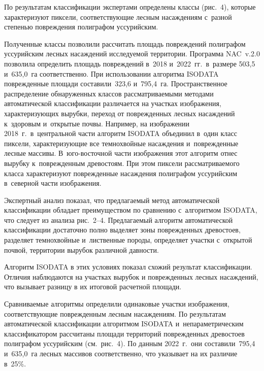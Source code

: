 \begin{multicols}{2}
  По результатам классификации экспертами определены классы 
(рис.~4), которые характеризуют пиксели, 
соответствующие лесным на\-саж\-де\-ни\-ям с~раз\-ной сте\-пенью по\-вреж\-де\-ния 
полиграфом уссурийским. 

Полученные классы позволили рассчитать площадь 
по\-вреж\-де\-ний полиграфом уссурийским лесных на\-саж\-де\-ний ис\-сле\-ду\-емой 
территории. Программа NAC~v.2.0 позволила определить площадь 
по\-вреж\-де\-ний в~2018 и~2022~гг.\ в~размере 503,5 и~635,0~га соответственно. При 
использовании алгоритма ISODATA по\-вреж\-де\-нные площади со\-ста\-ви\-ли~323,6 
и~795,4~га. Пространственное распределение обнаруженных классов 
рас\-смат\-ри\-ва\-емы\-ми методами автоматической классификации различается на 
участ\-ках изображения, ха\-рак\-те\-ри\-зу\-ющих вырубки, переход от поврежденных 
лес\-ных на\-саж\-де\-ний к~здоровым и~открытые поч\-вы. Например, на изображении 
2018~г.\ в~центральной час\-ти алгоритм ISODATA объединил в~один класс 
пиксели, ха\-рак\-те\-ри\-зу\-ющие все темнохвойные на\-саж\-де\-ния и~по\-вреж\-ден\-ные 
лесные массивы. В~юго-вос\-точ\-ной части изображения этот алгоритм отнес 
вы\-руб\-ку к~по\-вреж\-ден\-ным древостоям. При этом пиксели рас\-смат\-ри\-ва\-емо\-го 
клас\-са характеризуют по\-вреж\-ден\-ные насаждения полиграфом уссурийским 
в~северной час\-ти изоб\-ра\-же\-ния.
  

  
  Экспертный анализ показал, что пред\-ла\-га\-емый метод автоматической 
классификации обладает преимуществом по сравнению с~алгоритмом 
\mbox{ISODATA}, что следует из анализа рис.~2--4. Пред\-ла\-га\-емый алгоритм 
автоматической классификации достаточно пол\-но выделяет зоны 
по\-вреж\-ден\-ных древостоев, разделяет темнохвойные и~лиственные породы, 
определяет участ\-ки с~открытой почвой, территории вырубок различной 
дав\-ности.


 Алгоритм ISODATA в этих условиях показал схожий результат 
классификации. Отличия наблюдаются на участках вырубок и поврежденных 
лесных насаждений, что вызывает разницу в их итоговой расчетной площади. 

Сравниваемые алгоритмы определили одинаковые участки изображения, 
со\-от\-вет\-ст\-ву\-ющие по\-вреж\-ден\-ным лесным на\-саж\-де\-ни\-ям. По результатам 
автоматической классификации алгоритмом \mbox{ISODATA} и~не\-па\-ра\-мет\-ри\-че\-ским 
классификатором рас\-счи\-та\-ны площади территорий по\-вреж\-ден\-ных древостоев 
полиграфом уссурийским (см.\ рис.~4). По данным 2022~г.\ они со\-ста\-ви\-ли~795,4 
и~635,0~га лесных массивов соответственно, что указывает на их 
различие в~25\%.


\end{multicols}
